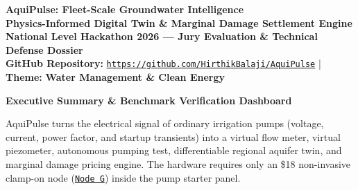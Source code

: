 \documentclass[10pt,a4paper]{article}
\begin{document}
\begin{center}
    {\LARGE \textbf{\color{primary}AquiPulse: Fleet-Scale Groundwater Intelligence}}\\[0.2em]
    {\large \textbf{\color{secondary}Physics-Informed Digital Twin \& Marginal Damage Settlement Engine}}\\[0.25em]
    {\normalsize \textbf{National Level Hackathon 2026 --- Jury Evaluation \& Technical Defense Dossier}}\\[0.25em]
    {\small \textbf{GitHub Repository:} \href{https://github.com/HirthikBalaji/AquiPulse}{\texttt{https://github.com/HirthikBalaji/AquiPulse}} \quad | \quad \textbf{Theme:} \textcolor{primary}{\textbf{Water Management \& Clean Energy}}}
\end{center}

\vspace{-0.6em}
\noindent\makebox[\linewidth]{\rule{\textwidth}{1.0pt}}
\vspace{-0.3em}

{\large \textbf{\color{primary}Executive Summary \& Benchmark Verification Dashboard}}

AquiPulse turns the electrical signal of ordinary irrigation pumps (voltage, current, power factor, and startup transients) into a virtual flow meter, virtual piezometer, autonomous pumping test, differentiable regional aquifer twin, and marginal damage pricing engine. The hardware requires only an \$18 non-invasive clamp-on node (\href{https://github.com/HirthikBalaji/AquiPulse/blob/main/firmware/include/aquipulse_node.h}{\texttt{Node G}}) inside the pump starter panel.
\end{document}
